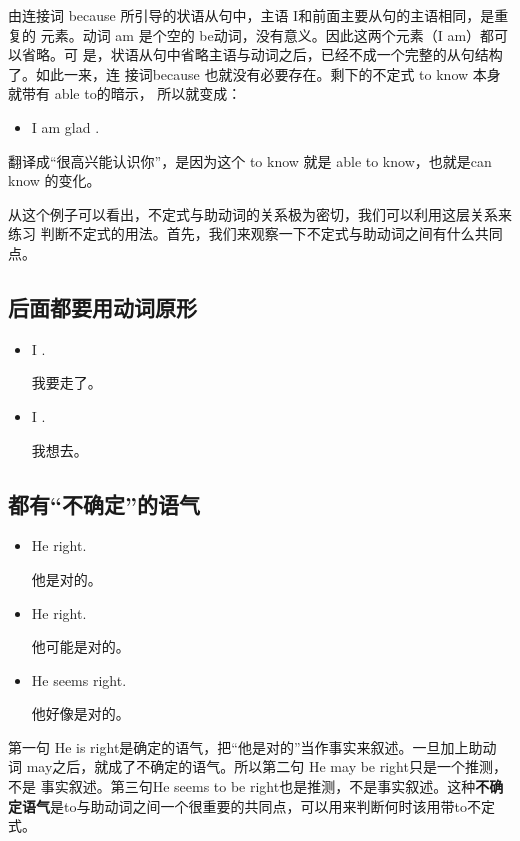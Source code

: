由连接词 because 所引导的状语从句中，主语 I和前面主要从句的主语相同，是重复的
元素。动词 am 是个空的 be动词，没有意义。因此这两个元素（I am）都可以省略。可
是，状语从句中省略主语与动词之后，已经不成一个完整的从句结构了。如此一来，连
接词because 也就没有必要存在。剩下的不定式 to know 本身就带有 able to的暗示，
所以就变成：

\begin{itemize}
\item  I am glad .
\end{itemize}

翻译成“很高兴能认识你”，是因为这个 to know 就是 able to know，也就是can
know 的变化。

从这个例子可以看出，不定式与助动词的关系极为密切，我们可以利用这层关系来练习
判断不定式的用法。首先，我们来观察一下不定式与助动词之间有什么共同点。

\subsection{后面都要用动词原形}

\begin{itemize}
\item I .

  我要走了。
\item I .

  我想去。
\end{itemize}

\subsection{都有“不确定”的语气}

\begin{itemize}
\item He  right.

  他是对的。
\item He  right.

  他可能是对的。
\item He seems  right.

  他好像是对的。
\end{itemize}

第一句 He is right是确定的语气，把“他是对的”当作事实来叙述。一旦加上助动
词 may之后，就成了不确定的语气。所以第二句 He may be right只是一个推测，不是
事实叙述。第三句He seems to be right也是推测，不是事实叙述。这种\textbf{不确
  定语气}是to与助动词之间一个很重要的共同点，可以用来判断何时该用带to不定式。

